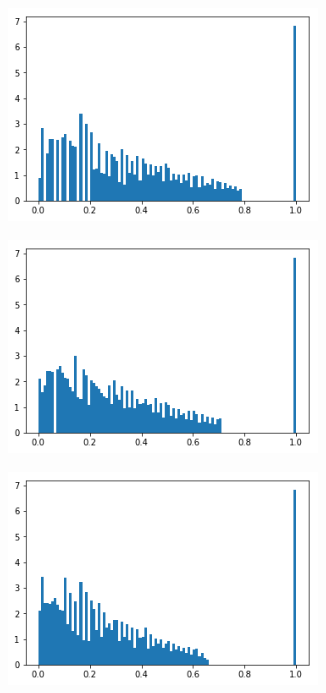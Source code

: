 \documentclass[10pt, a4paper]{article}
\begin{document}
\begin{figure}[H]	
	\centering
    \begin{subfigure}{0.3\textwidth}
        \includegraphics[width=0.9\textwidth]{patitos-histogramaFinal-k2.png}
    \end{subfigure}\hfill
    	\centering
    \begin{subfigure}{0.3\textwidth}
        \includegraphics[width=0.9\textwidth]{patitos-histogramaFinal-k4.png}
    \end{subfigure}\hfill	
    \centering
    \begin{subfigure}{0.3\textwidth}
        \includegraphics[width=0.9\textwidth]{patitos-histogramaFinal-k16.png}
    \end{subfigure}\hfill
\end{figure}
\end{document}
